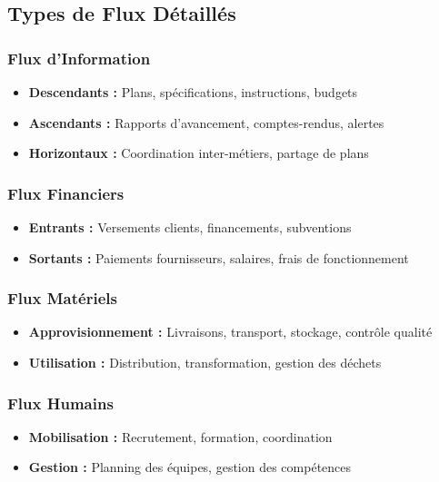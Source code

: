 \subsection{Types de Flux Détaillés}

\subsubsection{Flux d'Information}
\begin{itemize}
    \item \textbf{Descendants :} Plans, spécifications, instructions, budgets
    \item \textbf{Ascendants :} Rapports d'avancement, comptes-rendus, alertes
    \item \textbf{Horizontaux :} Coordination inter-métiers, partage de plans
\end{itemize}

\subsubsection{Flux Financiers}
\begin{itemize}
    \item \textbf{Entrants :} Versements clients, financements, subventions
    \item \textbf{Sortants :} Paiements fournisseurs, salaires, frais de fonctionnement
\end{itemize}

\subsubsection{Flux Matériels}
\begin{itemize}
    \item \textbf{Approvisionnement :} Livraisons, transport, stockage, contrôle qualité
    \item \textbf{Utilisation :} Distribution, transformation, gestion des déchets
\end{itemize}

\subsubsection{Flux Humains}
\begin{itemize}
    \item \textbf{Mobilisation :} Recrutement, formation, coordination
    \item \textbf{Gestion :} Planning des équipes, gestion des compétences
\end{itemize}

